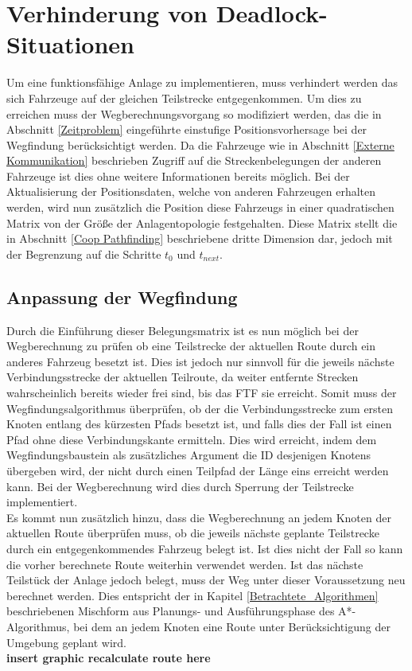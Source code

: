 \section{Verhinderung von Deadlock-Situationen}
	Um eine funktionsfähige Anlage zu implementieren, muss verhindert werden das sich Fahrzeuge auf der gleichen Teilstrecke  entgegenkommen. Um dies zu erreichen muss der Wegberechnungsvorgang so modifiziert werden, das die in Abschnitt \ref{Zeitproblem} eingeführte einstufige Positionsvorhersage bei der Wegfindung berücksichtigt werden. Da die Fahrzeuge wie in Abschnitt \ref{Externe Kommunikation} beschrieben Zugriff auf die Streckenbelegungen der anderen Fahrzeuge ist dies ohne weitere Informationen bereits möglich. Bei der Aktualisierung der Positionsdaten, welche von anderen Fahrzeugen erhalten werden, wird nun zusätzlich die Position diese Fahrzeugs in einer quadratischen Matrix von der Größe der Anlagentopologie festgehalten. Diese Matrix stellt die in Abschnitt \ref{Coop Pathfinding} beschriebene dritte Dimension dar, jedoch mit der Begrenzung auf die Schritte $t_0$ und $t_{next}$.

	\subsection{Anpassung der Wegfindung}
		Durch die Einführung dieser Belegungsmatrix ist es nun möglich bei der Wegberechnung zu prüfen ob eine Teilstrecke der aktuellen Route durch ein anderes Fahrzeug besetzt ist. Dies ist jedoch nur sinnvoll für die jeweils nächste Verbindungsstrecke der aktuellen Teilroute, da weiter entfernte Strecken wahrscheinlich bereits wieder frei sind, bis das \ac{FTF} sie erreicht. Somit muss der Wegfindungsalgorithmus überprüfen, ob der die Verbindungsstrecke zum ersten Knoten entlang des kürzesten Pfads besetzt ist, und falls dies der Fall ist einen Pfad ohne diese Verbindungskante ermitteln.	Dies wird erreicht, indem dem Wegfindungsbaustein als zusätzliches Argument die ID desjenigen Knotens übergeben wird, der nicht durch einen Teilpfad der Länge eins erreicht werden kann. Bei der Wegberechnung wird dies durch Sperrung der Teilstrecke implementiert.
		\\
		Es kommt nun zusätzlich hinzu, dass die Wegberechnung an jedem Knoten der aktuellen Route überprüfen muss, ob die jeweils nächste geplante Teilstrecke durch ein entgegenkommendes Fahrzeug belegt ist.   Ist dies nicht der Fall so kann die vorher berechnete Route weiterhin verwendet werden. Ist das nächste Teilstück der Anlage jedoch belegt, muss der Weg unter dieser Voraussetzung neu berechnet werden. Dies entspricht der in Kapitel \ref{Betrachtete_Algorithmen} beschriebenen Mischform aus Planungs- und Ausführungsphase des A*-Algorithmus, bei dem an jedem Knoten eine Route unter Berücksichtigung der Umgebung geplant wird.
		\\ \textbf{insert graphic recalculate route here}
	
